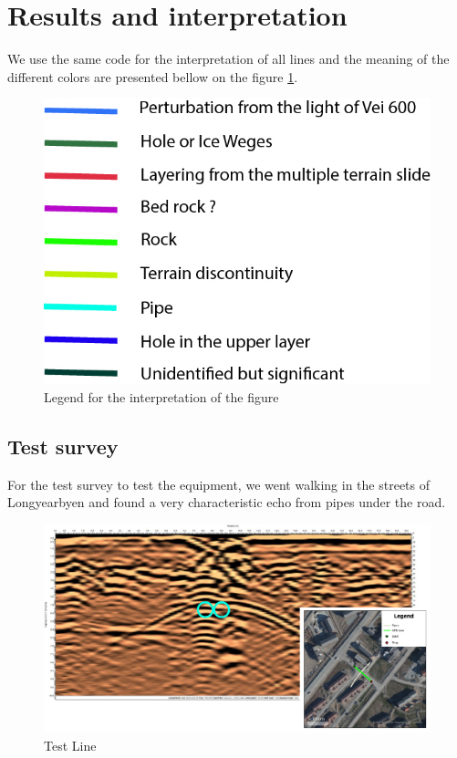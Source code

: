 \newpage
\section{Results and interpretation} \label{section:result}

We use the same code for the interpretation of all lines and the meaning of the different colors are presented bellow on the figure \ref{fig:legend}.

\begin{figure}[H]
    \centering
    \includegraphics[width=0.5\linewidth]{Images/00_Results/Legend.jpg}
    \caption{Legend for the interpretation of the figure }
    \label{fig:legend}
\end{figure}


\subsection{Test survey}

For the test survey to test the equipment, we went walking in the streets of Longyearbyen and found a very characteristic echo from pipes under the road.

\begin{figure}[H]
    \centering
    \includegraphics[width=\linewidth]{Images/00_Results/Test_line_edited.jpg}
    \caption{Test Line}
    \label{fig:testLine}
\end{figure}

